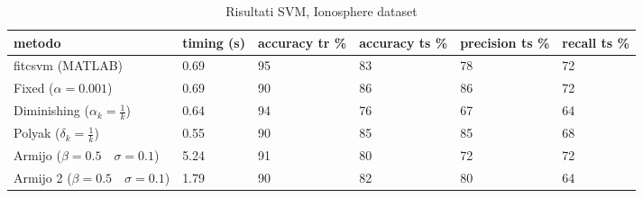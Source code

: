 \documentclass[12pt]{extarticle}
\begin{document}
\begin{table}[]
    \setlength{\tabcolsep}{10pt} %
    \renewcommand{\arraystretch}{1.2} %
    \centering
    \begin{tabular}{ |p{3cm}||p{1.5cm}|p{2cm}|p{2cm}|p{2cm}|p{1.5cm}|  }
    \hline
    metodo & timing (s) & accuracy tr \% & accuracy ts \% & precision ts \% & recall ts \%\\
    \hline
    \hline
    fitcsvm (MATLAB) & 0.69  & 95 & 83 & 78 & 72\\
    \hline
    \hline
    Fixed ($\alpha = 0.001$) & 0.69 & 90 & 86 & 86 & 72\\
    \hline
    Diminishing ($\alpha_k = \frac{1}{k}$) & 0.64 & 94 & 76 & 67 & 64\\
    \hline
    Polyak ($\delta_k = \frac{1}{k}$) & 0.55 & 90 & 85 & 85 & 68\\
    \hline
    Armijo ($\beta = 0.5 \quad \sigma = 0.1$) & 5.24 & 91 & 80 & 72 & 72\\
    \hline
    Armijo 2 ($\beta = 0.5 \quad \sigma = 0.1$) & 1.79 & 90 & 82 & 80 & 64\\
    \hline
    \end{tabular}
    \caption{Risultati SVM, Ionosphere dataset}
    \label{table:svmresults}
\end{table}


\end{document}
